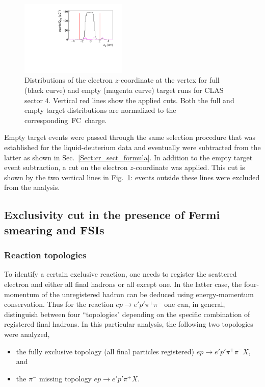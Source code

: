 \documentclass[prc,twocolumn,superscriptaddress,showpacs,amssymb,amsmath,amsfonts,aps,nofootinbib]{revtex4-1}
\begin{document}
\begin{figure}[htp]
\begin{center}
 \includegraphics[width=0.45\textwidth,keepaspectratio]{pictures/event_selection/z_vertex.pdf}
\caption{Distributions of the electron $z$-coordinate at the vertex for full (black curve) and empty (magenta curve) target runs for CLAS sector 4. Vertical red lines show the applied cuts. Both the full and empty target distributions are normalized to the corresponding~FC~charge.  }
\label{fig:z_vertex}
\end{center}
\end{figure}

Empty target events were passed through the same selection procedure that was established for the liquid-deuterium data and eventually were subtracted from the latter as shown in Sec.\!~\ref{Sect:cr_sect_formula}. In addition to the empty target event subtraction, a cut on the electron $z$-coordinate was applied. This cut is shown by the two vertical lines in Fig.\!~\ref{fig:z_vertex}: events outside these lines were excluded from the analysis. 


\subsection{Exclusivity cut in the presence of Fermi smearing and FSIs}
\label{Sect:excl_cut}

\subsubsection{Reaction topologies}
\label{Sect:topologies}

To identify a certain exclusive reaction, one needs to register the scattered electron and either all final hadrons or all except one. In the latter case, the four-momentum of the unregistered hadron can be deduced using energy-momentum conservation. Thus for the reaction $e p \rightarrow e' p' \pi^{+} \pi^{-} $ one can, in general, distinguish between four ``topologies" depending on the specific combination of registered final hadrons. In this particular analysis, the following two topologies were analyzed,
\begin{itemize}
\item the fully exclusive topology (all final particles registered) $e p \rightarrow e' p' \pi^{+} \pi^{-} X$, and
\item the $\pi^{-}$ missing topology $e p \rightarrow e' p' \pi^{+} X$.
\end{itemize} 
\end{document}
